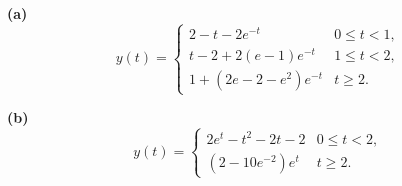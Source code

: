 \noindent\textbf{(a)} \[y(t)=\begin{cases}2-t-2e^{-t}&0\le t<1,\\t-2+2(e-1)e^{-t}&1\le t<2,\\1+(2e-2-e^2)e^{-t}&t\ge2.\end{cases}\]

\noindent\textbf{(b)} \[y(t)=\begin{cases}2e^t-t^2-2t-2&0\le t<2,\\(2-10e^{-2})e^t&t\ge2.\end{cases}\]
